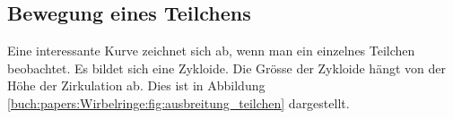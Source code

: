 \subsection{Bewegung eines Teilchens}



Eine interessante Kurve zeichnet sich ab, wenn man ein einzelnes Teilchen beobachtet.
Es bildet sich eine Zykloide.
Die Grösse der Zykloide hängt von der Höhe der Zirkulation ab.
Dies ist in Abbildung \ref{buch:papers:Wirbelringe:fig:ausbreitung_teilchen} dargestellt.

